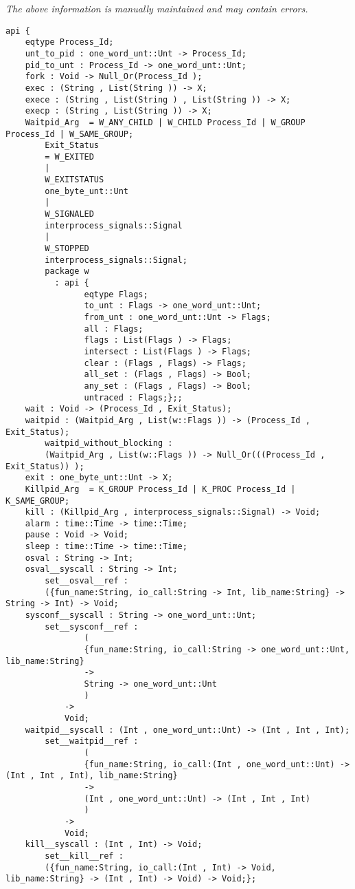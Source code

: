 \label{api:Posix\_Process}

{\tiny \it The above information is manually maintained and may contain errors.}
\begin{verbatim}
api {
    eqtype Process_Id;
    unt_to_pid : one_word_unt::Unt -> Process_Id;
    pid_to_unt : Process_Id -> one_word_unt::Unt;
    fork : Void -> Null_Or(Process_Id );
    exec : (String , List(String )) -> X;
    exece : (String , List(String ) , List(String )) -> X;
    execp : (String , List(String )) -> X;
    Waitpid_Arg  = W_ANY_CHILD | W_CHILD Process_Id | W_GROUP Process_Id | W_SAME_GROUP;
        Exit_Status
        = W_EXITED
        |
        W_EXITSTATUS
        one_byte_unt::Unt
        |
        W_SIGNALED
        interprocess_signals::Signal
        |
        W_STOPPED
        interprocess_signals::Signal;
        package w
          : api {
                eqtype Flags;
                to_unt : Flags -> one_word_unt::Unt;
                from_unt : one_word_unt::Unt -> Flags;
                all : Flags;
                flags : List(Flags ) -> Flags;
                intersect : List(Flags ) -> Flags;
                clear : (Flags , Flags) -> Flags;
                all_set : (Flags , Flags) -> Bool;
                any_set : (Flags , Flags) -> Bool;
                untraced : Flags;};;
    wait : Void -> (Process_Id , Exit_Status);
    waitpid : (Waitpid_Arg , List(w::Flags )) -> (Process_Id , Exit_Status);
        waitpid_without_blocking :
        (Waitpid_Arg , List(w::Flags )) -> Null_Or(((Process_Id , Exit_Status)) );
    exit : one_byte_unt::Unt -> X;
    Killpid_Arg  = K_GROUP Process_Id | K_PROC Process_Id | K_SAME_GROUP;
    kill : (Killpid_Arg , interprocess_signals::Signal) -> Void;
    alarm : time::Time -> time::Time;
    pause : Void -> Void;
    sleep : time::Time -> time::Time;
    osval : String -> Int;
    osval__syscall : String -> Int;
        set__osval__ref :
        ({fun_name:String, io_call:String -> Int, lib_name:String} -> String -> Int) -> Void;
    sysconf__syscall : String -> one_word_unt::Unt;
        set__sysconf__ref :
                (
                {fun_name:String, io_call:String -> one_word_unt::Unt, lib_name:String}
                ->
                String -> one_word_unt::Unt
                )
            ->
            Void;
    waitpid__syscall : (Int , one_word_unt::Unt) -> (Int , Int , Int);
        set__waitpid__ref :
                (
                {fun_name:String, io_call:(Int , one_word_unt::Unt) -> (Int , Int , Int), lib_name:String}
                ->
                (Int , one_word_unt::Unt) -> (Int , Int , Int)
                )
            ->
            Void;
    kill__syscall : (Int , Int) -> Void;
        set__kill__ref :
        ({fun_name:String, io_call:(Int , Int) -> Void, lib_name:String} -> (Int , Int) -> Void) -> Void;};
\end{verbatim}
